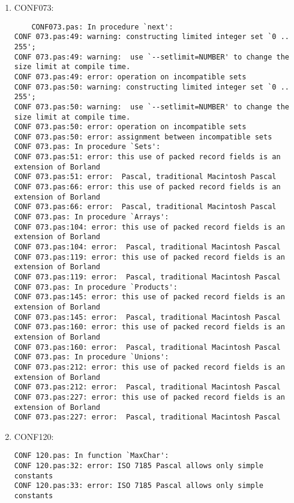 \documentclass[a4paper]{article}
\begin{document}
\begin{enumerate}
    \item CONF073:
        \begin{small}\begin{verbatim}
	CONF073.pas: In procedure `next':
CONF 073.pas:49: warning: constructing limited integer set `0 .. 255';
CONF 073.pas:49: warning:  use `--setlimit=NUMBER' to change the size limit at compile time.
CONF 073.pas:49: error: operation on incompatible sets
CONF 073.pas:50: warning: constructing limited integer set `0 .. 255';
CONF 073.pas:50: warning:  use `--setlimit=NUMBER' to change the size limit at compile time.
CONF 073.pas:50: error: operation on incompatible sets
CONF 073.pas:50: error: assignment between incompatible sets
CONF 073.pas: In procedure `Sets':
CONF 073.pas:51: error: this use of packed record fields is an extension of Borland
CONF 073.pas:51: error:  Pascal, traditional Macintosh Pascal
CONF 073.pas:66: error: this use of packed record fields is an extension of Borland
CONF 073.pas:66: error:  Pascal, traditional Macintosh Pascal
CONF 073.pas: In procedure `Arrays':
CONF 073.pas:104: error: this use of packed record fields is an extension of Borland
CONF 073.pas:104: error:  Pascal, traditional Macintosh Pascal
CONF 073.pas:119: error: this use of packed record fields is an extension of Borland
CONF 073.pas:119: error:  Pascal, traditional Macintosh Pascal
CONF 073.pas: In procedure `Products':
CONF 073.pas:145: error: this use of packed record fields is an extension of Borland
CONF 073.pas:145: error:  Pascal, traditional Macintosh Pascal
CONF 073.pas:160: error: this use of packed record fields is an extension of Borland
CONF 073.pas:160: error:  Pascal, traditional Macintosh Pascal
CONF 073.pas: In procedure `Unions':
CONF 073.pas:212: error: this use of packed record fields is an extension of Borland
CONF 073.pas:212: error:  Pascal, traditional Macintosh Pascal
CONF 073.pas:227: error: this use of packed record fields is an extension of Borland
CONF 073.pas:227: error:  Pascal, traditional Macintosh Pascal
        \end{verbatim}\end{small}

    \item CONF120:
        \begin{small}\begin{verbatim}
CONF 120.pas: In function `MaxChar':
CONF 120.pas:32: error: ISO 7185 Pascal allows only simple constants
CONF 120.pas:33: error: ISO 7185 Pascal allows only simple constants
        \end{verbatim}\end{small}


\end{enumerate}
\end{document}
